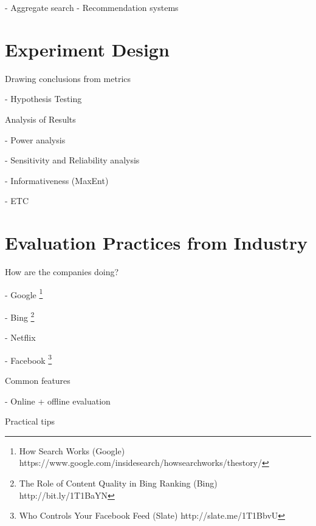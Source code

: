 \documentclass[openany]{now} %
\newcommand{\newpar}{\bigskip\noindent}
\begin{document}
- Aggregate search \cite{Zhou:2013}
- Recommendation systems \cite{gunawardana2015evaluating}

\chapter{Experiment Design}
Drawing conclusions from metrics

- Hypothesis Testing \cite{Dincer:2014}

\newpar
Analysis of Results

- Power analysis \cite{Sakai:2014}

- Sensitivity and Reliability analysis \cite{Urbano:2013} 

- Informativeness (MaxEnt)

- ETC \cite{Bron:2013} \cite{Boytsov:2013}  \cite{Robertson:2012}



\chapter{Evaluation Practices from Industry}

How are the companies doing?

-	Google \footnote{How Search Works (Google) https://www.google.com/insidesearch/howsearchworks/thestory/}

-	Bing \footnote{The Role of Content Quality in Bing Ranking (Bing)
	 http://bit.ly/1T1BaYN}

-	Netflix \cite{Gomez-Uribe2015}

-	Facebook \footnote{Who Controls Your Facebook Feed (Slate) http://slate.me/1T1BbvU}

\newpar
Common features

- Online + offline evaluation

\newpar
Practical tips


\backmatter  %



	
\end{document}
